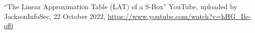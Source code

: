 \begin{thebibliography}{9}
	``The Linear Approximation Table (LAT) of a S-Box'' YouTube, uploaded by JacksonInfoSec, 22 October 2022, \url{https://www.youtube.com/watch?v=hHG_Ife-of0}
\end{thebibliography}